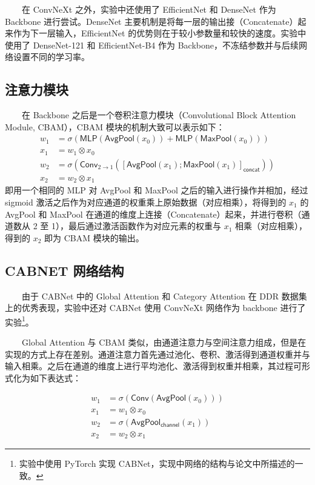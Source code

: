 \documentclass[twocolumn, fontsize=10pt]{article}
\begin{document}
　　在 ConvNeXt 之外，实验中还使用了 EfficientNet\cite{tan2019} 和 DenseNet\cite{huang2016} 作为 Backbone 进行尝试。DenseNet 主要机制是将每一层的输出接（Concatenate）起来作为下一层输入，EfficientNet 的优势则在于较小参数量和较快的速度。实验中使用了 DenseNet-121 和 EfficientNet-B4 作为 Backbone，不冻结参数并与后续网络设置不同的学习率。

\subsection{注意力模块}

　　在 Backbone 之后是一个卷积注意力模块（Convolutional Block Attention Module, CBAM）\cite{woo2018}，CBAM 模块的机制大致可以表示如下：
$$
\begin{aligned}
    w_1 &=\sigma(\mathsf{MLP}(\mathsf{AvgPool}(x_0))+ \mathsf{MLP}(\mathsf{MaxPool}(x_0)))\\
    x_1 &= w_1 \otimes x_0\\
    w_2 &=\sigma(\mathsf{Conv}_{2\rightarrow 1}([\mathsf{AvgPool}(x_1); \mathsf{MaxPool}(x_1)]_{\mathsf{concat}}))\\
    x_2 &= w_2 \otimes x_1
\end{aligned}
$$
即用一个相同的 MLP 对 AvgPool 和 MaxPool 之后的输入进行操作并相加，经过 sigmoid 激活之后作为对应通道的权重乘上原始数据（对应相乘），将得到的 $x_1$ 的 AvgPool 和 MaxPool 在通道的维度上连接（Concatenate）起来，并进行卷积（通道数从 2 至 1），最后通过激活函数作为对应元素的权重与 $x_1$ 相乘（对应相乘），得到的 $x_2$ 即为 CBAM 模块的输出。

\subsection{CABNET 网络结构}

　　由于 CABNet\cite{he2021} 中的 Global Attention 和 Category Attention 在 DDR 数据集上的优秀表现，实验中还对 CABNet 使用 ConvNeXt 网络作为 backbone 进行了实验\footnote{实验中使用 PyTorch 实现 CABNet，实现中网络的结构与论文中所描述的一致。}。

　　Global Attention 与 CBAM 类似，由通道注意力与空间注意力组成，但是在实现的方式上存在差别。通道注意力首先通过池化、卷积、激活得到通道权重并与输入相乘。之后在通道的维度上进行平均池化、激活得到权重并相乘，其过程可形式化为如下表达式：

$$
\begin{aligned}
w_1 &=\sigma(\mathsf{Conv}(\mathsf{AvgPool}(x_0)))\\
x_1 &= w_1 \otimes x_0\\
w_2 &=\sigma(\mathsf{AvgPool_{channel}}(x_1))\\
x_2 &= w_2 \otimes x_1
\end{aligned}
$$
\end{document}
